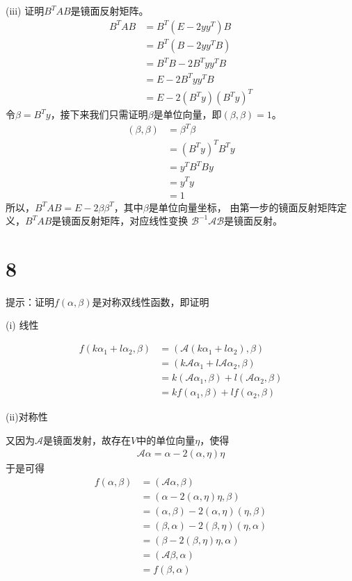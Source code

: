 \documentclass{article}
\begin{document}
(iii) 证明$B^T A B$是镜面反射矩阵。
\begin{align*}
  B^T A B & = B^T (E - 2 y y^T) B    \\
          & = B^T(B - 2 y y^T B)     \\
          & = B^T B - 2 B^T y y^T B  \\
          & = E - 2 B^T y y^T B      \\
          & = E - 2 (B^T y)(B^T y)^T
\end{align*}
令$\beta = B^T y$，接下来我们只需证明$\beta$是单位向量，即$(\beta, \beta) = 1$。
\begin{align*}
  (\beta, \beta) & = \beta^T \beta   \\
                 & = (B^T y)^T B^T y \\
                 & = y^T B^T B y     \\
                 & = y^T y           \\
                 & = 1
\end{align*}
所以，$ B^T A B = E - 2 \beta \beta^T$，其中$\beta$是单位向量坐标，
由第一步的镜面反射矩阵定义，$B^T A B$是镜面反射矩阵，对应线性变换
$\mathscr{B}^{-1} \mathscr{A} \mathscr{B}$是镜面反射。

\section*{8}

提示：证明$f(\alpha, \beta)$是对称双线性函数，即证明

(i) 线性

\begin{align*}
  f(k\alpha_1 + l \alpha_2, \beta)
   & = (\mathscr{A}(k\alpha_1 + l \alpha_2), \beta)                    \\
   & = (k \mathscr{A} \alpha_1 + l \mathscr{A} \alpha_2, \beta)        \\
   & = k(\mathscr{A} \alpha_1, \beta) + l(\mathscr{A} \alpha_2, \beta) \\
   & = kf(\alpha_1, \beta) + lf(\alpha_2, \beta)
\end{align*}

(ii)对称性

又因为$\mathscr{A}$是镜面发射，故存在$V$中的单位向量$\eta$，使得
\begin{align*}
  \mathscr{A} \alpha = \alpha - 2 (\alpha, \eta) \eta
\end{align*}
于是可得
\begin{align*}
  f(\alpha, \beta)
   & = (\mathscr{A} \alpha, \beta)                      \\
   & = (\alpha - 2 (\alpha, \eta) \eta, \beta)          \\
   & = (\alpha, \beta) - 2 (\alpha, \eta) (\eta, \beta) \\
   & = (\beta, \alpha) - 2 (\beta, \eta)(\eta, \alpha)  \\
   & = (\beta - 2 (\beta, \eta) \eta, \alpha)           \\
   & = (\mathscr{A} \beta, \alpha)                      \\
   & = f(\beta, \alpha)
\end{align*}
\end{document}
